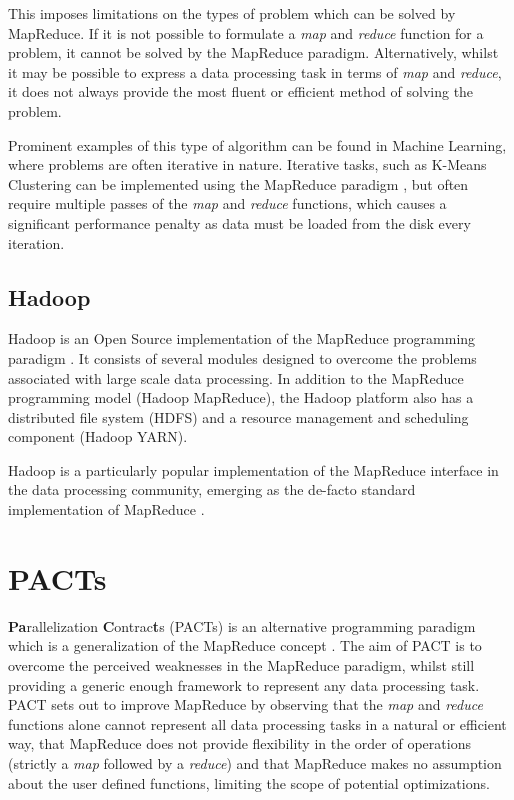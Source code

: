 This imposes limitations on the types of problem which can be solved by MapReduce. If it is not possible to formulate a \textit{map} and \textit{reduce} function for a problem, it cannot be solved by the MapReduce paradigm. Alternatively, whilst it may be possible to express a data processing task in terms of \textit{map} and \textit{reduce}, it does not always provide the most fluent or efficient method of solving the problem. 

Prominent examples of this type of algorithm can be found in Machine Learning, where problems are often iterative in nature. Iterative tasks, such as K-Means Clustering can be implemented using the MapReduce paradigm \cite{zhao2009parallel}, but often require multiple passes of the \textit{map} and \textit{reduce} functions, which causes a significant performance penalty as data must be loaded from the disk every iteration.

\subsection{Hadoop}
Hadoop is an Open Source implementation of the MapReduce programming paradigm \cite{hadoop}. It consists of several modules designed to overcome the problems associated with large scale data processing. In addition to the MapReduce programming model (Hadoop MapReduce), the Hadoop platform also has a distributed file system (HDFS) and a resource management and scheduling component (Hadoop YARN). 

Hadoop is a particularly popular implementation of the MapReduce interface in the data processing community, emerging as the de-facto standard implementation of MapReduce \cite{qin2013reflection}.

\section{PACTs}
\textbf{Pa}rallelization \textbf{C}ontrac\textbf{t}s (PACTs) is an alternative programming paradigm which is a generalization of the MapReduce concept \cite{battre2010socc}. The aim of PACT is to overcome the perceived weaknesses in the MapReduce paradigm, whilst still providing a generic enough framework to represent any data processing task. PACT sets out to improve MapReduce by observing that the \textit{map} and \textit{reduce} functions alone cannot represent all data processing tasks in a natural or efficient way, that MapReduce does not provide flexibility in the order of operations (strictly a \textit{map} followed by a \textit{reduce}) and that MapReduce makes no assumption about the user defined functions, limiting the scope of potential optimizations.

